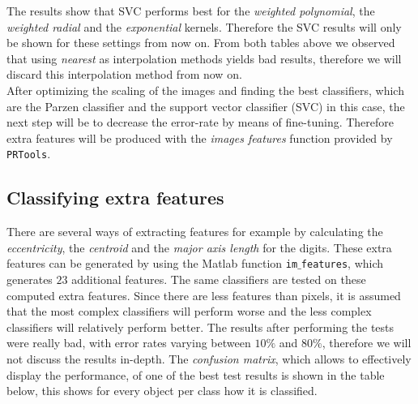 \documentclass{article}
\begin{document}
The results show that SVC performs best for the \emph{weighted polynomial}, the \emph{weighted radial} and the \emph{exponential} kernels. Therefore the SVC results will only be shown for these settings from now on. From both tables above we observed that using \emph{nearest} as interpolation methods yields bad results, therefore we will discard this interpolation method from now on. \\

After optimizing the scaling of the images and finding the best classifiers, which are the Parzen classifier and the support vector classifier (SVC) in this case, the next step will be to decrease the error-rate by means of fine-tuning. Therefore extra features will be produced with the \emph{images features} function provided by \texttt{PRTools}. 

\clearpage

\subsection{Classifying extra features}

There are several ways of extracting features for example by calculating the \emph{eccentricity}, the \emph{centroid} and the \emph{major axis length} for the digits. These extra features can be generated by using the Matlab function \texttt{im$\_$features}, which generates $23$ additional features. The same classifiers are tested on these computed extra features. Since there are less features than pixels, it is assumed that the most complex classifiers will perform worse and the less complex classifiers will relatively perform better. The results after performing the tests were really bad, with error rates varying between $10\%$ and 80$\%$, therefore we will not discuss the results in-depth. The \emph{confusion matrix}, which allows to effectively display the performance, of one of the best test results is shown in the table below, this shows for every object per class how it is classified. 
\end{document}

